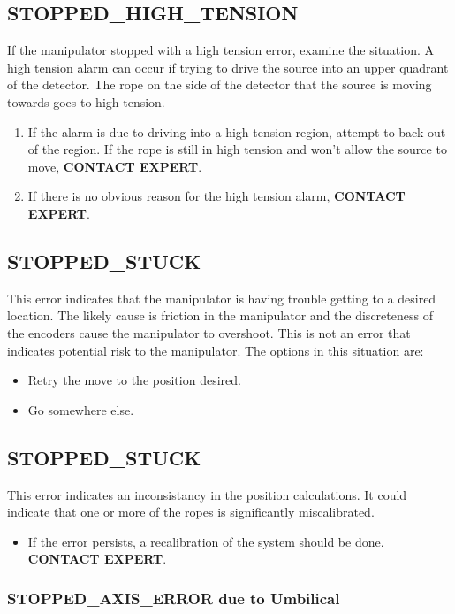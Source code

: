 \subsection{STOPPED\_HIGH\_TENSION}
  If the manipulator stopped with a high tension error, examine the 
situation.  A high tension alarm can occur if trying to drive the
source into an upper quadrant of the detector.  The rope on the side
of the detector that the source is moving towards goes to high tension.
  
\begin{enumerate}
\item If the alarm is due to driving into a high tension region,
  attempt to back out of the region.  If the rope is still in
  high tension and won't allow the  source to move,
  {\bf CONTACT EXPERT}.
\item If there is no obvious reason for the high tension alarm,
  {\bf CONTACT EXPERT}.
\end{enumerate}
  
\subsection{STOPPED\_STUCK}
  This error indicates that the manipulator is having trouble getting
to a desired location.  The likely cause is friction in the manipulator
and the discreteness of the encoders cause the manipulator to overshoot.
This is not an error that indicates potential risk to the manipulator.
The options in this situation are:
\begin{itemize}
\item Retry the move to the position desired.
\item Go somewhere else.
\end{itemize}

\subsection{STOPPED\_STUCK}
  This error indicates an inconsistancy in the position calculations.
It could indicate that one or more of the ropes is significantly miscalibrated.
\begin{itemize}
\item If the error persists, a recalibration of the system should be done.
  {\bf CONTACT EXPERT}.
\end{itemize}

\subsubsection{STOPPED\_AXIS\_ERROR due to Umbilical}
  
